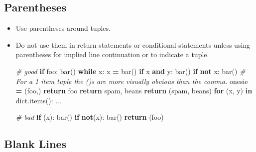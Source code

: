 \documentclass[
]{book}
\newenvironment{Shaded}{\begin{snugshade}}{\end{snugshade}}
\newcommand{\BuiltInTok}[1]{#1}
\newcommand{\CommentTok}[1]{\textcolor[rgb]{0.56,0.35,0.01}{\textit{#1}}}
\newcommand{\ControlFlowTok}[1]{\textcolor[rgb]{0.13,0.29,0.53}{\textbf{#1}}}
\newcommand{\KeywordTok}[1]{\textcolor[rgb]{0.13,0.29,0.53}{\textbf{#1}}}
\newcommand{\NormalTok}[1]{#1}
\newcommand{\OperatorTok}[1]{\textcolor[rgb]{0.81,0.36,0.00}{\textbf{#1}}}
\begin{document}
\hypertarget{parentheses}{%
\subsection{Parentheses}\label{parentheses}}

\begin{itemize}
\item
  Use parentheses around tuples.
\item
  Do not use them in return statements or conditional statements
  unless using parentheses for implied line continuation or to indicate a tuple.

\begin{Shaded}
\begin{Highlighting}[]
\CommentTok{# good}
\ControlFlowTok{if}\NormalTok{ foo:}
\NormalTok{    bar()}
\ControlFlowTok{while}\NormalTok{ x:}
\NormalTok{    x }\OperatorTok{=}\NormalTok{ bar()}
\ControlFlowTok{if}\NormalTok{ x }\KeywordTok{and}\NormalTok{ y:}
\NormalTok{    bar()}
\ControlFlowTok{if} \KeywordTok{not}\NormalTok{ x:}
\NormalTok{    bar()}
\CommentTok{# For a 1 item tuple the ()s are more visually obvious than the comma.}
\NormalTok{onesie }\OperatorTok{=}\NormalTok{ (foo,)}
\ControlFlowTok{return}\NormalTok{ foo}
\ControlFlowTok{return}\NormalTok{ spam, beans}
\ControlFlowTok{return}\NormalTok{ (spam, beans)}
\ControlFlowTok{for}\NormalTok{ (x, y) }\KeywordTok{in} \BuiltInTok{dict}\NormalTok{.items(): ...}

\CommentTok{# bad}
\ControlFlowTok{if}\NormalTok{ (x):}
\NormalTok{    bar()}
\ControlFlowTok{if} \KeywordTok{not}\NormalTok{(x):}
\NormalTok{    bar()}
\ControlFlowTok{return}\NormalTok{ (foo)}
\end{Highlighting}
\end{Shaded}
\end{itemize}

\hypertarget{blank-lines}{%
\subsection{Blank Lines}\label{blank-lines}}
\end{document}
